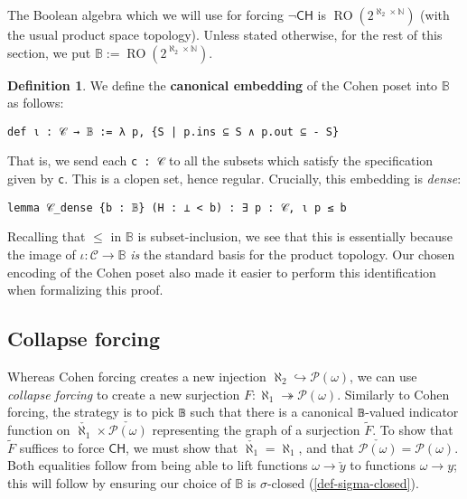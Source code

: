 \documentclass[sigplan,10pt,review, anonymous]{acmart}
\newcommand{\B}{\mathbb{B}}
\newcommand{\lil}{\lstinline}
\newcommand{\CH}{\mathsf{CH}}
\theoremstyle{definition}
\newtheorem{defn}{Definition}[section]
\begin{document}
The Boolean algebra which we will use for forcing $\neg\mathsf{CH}$ is $\operatorname{RO}(2^{\aleph_2 \times \mathbb{N}})$ (with the usual product space topology). Unless stated otherwise, for the rest of this section, we put $\B := \operatorname{RO}(2^{\aleph_2 \times \mathbb{N}})$.

\begin{defn}
  We define the \textbf{canonical embedding} of the Cohen poset into $\B$ as follows:
  \begin{lstlisting}
def ι : 𝒞 → 𝔹 := λ p, {S | p.ins ⊆ S ∧ p.out ⊆ - S}
\end{lstlisting}
\end{defn}
That is, we send each \lil{c : 𝒞} to all the subsets which satisfy the specification given by \lil{c}. This is a clopen set, hence regular. Crucially, this embedding is \emph{dense}:
\begin{lstlisting}
lemma 𝒞_dense {b : 𝔹} (H : ⊥ < b) : ∃ p : 𝒞, ι p ≤ b
\end{lstlisting}
Recalling that $\leq$ in $\B$ is subset-inclusion, we see that this is essentially because the image of $\iota : \mathcal{C} \to \B$ \emph{is} the standard basis for the product topology. Our chosen encoding of the Cohen poset also made it easier to perform this identification when formalizing this proof.

\subsection{Collapse forcing} \label{subsection:collapse}

Whereas Cohen forcing creates a new injection \(\aleph_2 \hookrightarrow \mathcal{P}(\omega)\), we can use \emph{collapse forcing} to create a new surjection \(F : \aleph_1 \twoheadrightarrow \mathcal{P}(\omega)\). Similarly to Cohen forcing, the strategy is to pick \lil{𝔹} such that there is a canonical \lil{𝔹}-valued indicator function on \(\check{\aleph_1} \times \check{\mathcal{P}(\omega)}\) representing the graph of a surjection \(\widetilde{F}\). To show that \(\widetilde{F}\) suffices to force \(\CH\), we must show that \(\check{\aleph_1} = \aleph_1\), and that \(\check{\mathcal{P}(\omega)} = \mathcal{P}(\omega).\) Both equalities follow from being able to lift functions \(\omega \to \check{y}\) to functions \(\omega \to y\); this will follow by ensuring our choice of \(\mathbb{B}\) is \(\sigma\)-closed (\ref{def-sigma-closed}).
\end{document}
